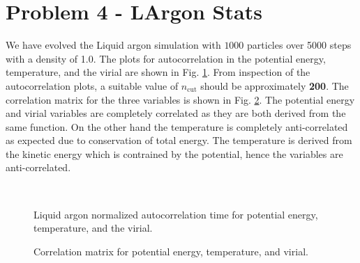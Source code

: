 \documentclass[singlepage,notitlepage,nofootinbib,11pt]{revtex4-1}
\begin{document}
\section{Problem 4 - LArgon Stats}
We have evolved the Liquid argon simulation with $1000$ particles over 5000 steps with a density of 1.0. The plots for autocorrelation in the potential energy, temperature, and the virial are shown in Fig. \ref{lauto}. From inspection of the autocorrelation plots, a suitable value of $n_{\text{cut}}$ should be approximately {\bf 200}. The correlation matrix for the three variables is shown in Fig. \ref{larcorr}. The potential energy and virial variables are completely correlated as they are both derived from the same function. On the other hand the temperature is completely anti-correlated as expected due to conservation of total energy. The temperature is derived from the kinetic energy which is contrained by the potential, hence the variables are anti-correlated. 
\begin{figure}[h]
\centering
  \captionsetup[subfigure]{labelformat=empty}
  \\
\caption{\label{lauto} Liquid argon normalized autocorrelation time for potential energy, temperature, and the virial.}
\end{figure}
\begin{figure}[h]
\centering
  \captionsetup[subfigure]{labelformat=empty}
\caption{\label{larcorr} Correlation matrix for potential energy, temperature, and virial. }
\end{figure}
\end{document}
